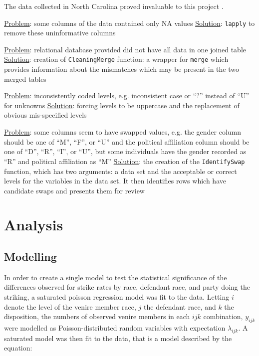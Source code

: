 \documentclass{article}
\begin{document}
The data collected in North Carolina proved invaluable to this project \cite{JurySunshineProj}.

\underline{Problem}: some columns of the data contained only NA values
\underline{Solution}: \texttt{lapply} to remove these uninformative columns

\underline{Problem}: relational database provided did not have all data in one joined table
\underline{Solution}: creation of \texttt{CleaningMerge} function: a wrapper for \texttt{merge} which provides information about the
mismatches which may be present in the two merged tables

\underline{Problem}: inconsistently coded levels, e.g. inconsistent case or ``?'' instead of ``U'' for unknowns
\underline{Solution}: forcing levels to be uppercase and the replacement of obvious mis-specified levels

\underline{Problem}: some columns seem to have swapped values, e.g. the gender column should be one of ``M'', ``F'', or ``U'' and the
political affiliation column should be one of ``D'', ``R'', ``I'', or ``U'', but some individuals have the gender recorded as
``R'' and political affiliation as ``M''
\underline{Solution}: the creation of the \texttt{IdentifySwap} function, which has two arguments: a data set and the acceptable or correct
levels for the variables in the data set. It then identifies rows which have candidate swaps and presents them for review

\section{Analysis} \label{sec:analysis}

\subsection{Modelling} \label{subse:mods}

In order to create a single model to test the statistical significance of the differences observed for strike rates by race,
defendant race, and party doing the striking, a saturated poisson regression model was fit to the data. Letting $i$ denote the
level of the venire member race, $j$ the defendant race, and $k$ the disposition, the numbers of observed venire members in each
$ijk$ combination, $y_{ijk}$ were modelled as Poisson-distributed random variables with expectation $\lambda_{ijk}$. A saturated
model was then fit to the data, that is a model described by the equation:
\end{document}
